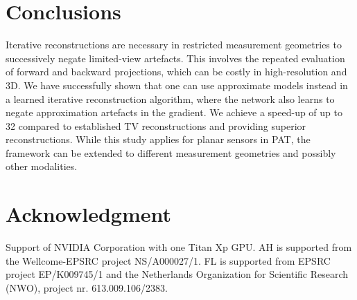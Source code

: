 \documentclass[runningheads]{llncs}
\begin{document}
\section{Conclusions}
Iterative reconstructions are necessary in restricted measurement 
geometries to successively negate limited-view artefacts. This involves 
the repeated evaluation of forward and backward projections, which can 
be costly in high-resolution and 3D. We have successfully shown that 
one can use approximate models instead in a learned iterative 
reconstruction algorithm, where the network also learns to negate 
approximation artefacts in the gradient. We achieve a speed-up of up to 32 compared to established TV reconstructions and providing 
superior reconstructions. While this study applies for planar sensors 
in PAT, the framework can be extended to different measurement 
geometries and possibly other modalities.


\section*{Acknowledgment}
Support of NVIDIA Corporation with one Titan Xp GPU.
AH is supported from the Wellcome-EPSRC project NS/A000027/1. FL is supported from EPSRC project EP/K009745/1 and the Netherlands Organization for Scientific Research (NWO), project nr. 613.009.106/2383.

\vspace{-0.5em}


\end{document}

